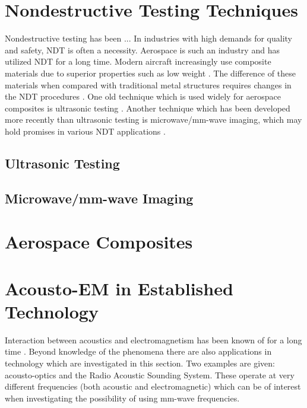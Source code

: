 \documentclass[11pt,twoside]{eitExjobb}
\begin{document}
	\section{Nondestructive Testing Techniques}
	Nondestructive testing has been ... In industries with high demands for quality and safety, NDT is often a necessity. Aerospace is such an industry and has utilized NDT for a long time. \addref Modern aircraft increasingly use composite materials due to superior properties such as low weight \cite{Katunin2015}. The difference of these materials when compared with traditional metal structures requires changes in the NDT procedures \cite{Riegert2006}. One old technique which is used widely for aerospace composites is ultrasonic testing \cite{Garnier2011}. Another technique which has been developed more recently than ultrasonic testing is microwave/mm-wave imaging, which may hold promises in various NDT applications \cite{Kharkovsky2007}.
	
	\subsection{Ultrasonic Testing}
	
	\subsection{Microwave/mm-wave Imaging}
	
	\section{Aerospace Composites}
	
	\section{Acousto-EM in Established Technology}
	Interaction between acoustics and electromagnetism has been known of for a long time \addref. Beyond knowledge of the phenomena there are also applications in technology which are investigated in this section. Two examples are given: acousto-optics and the Radio Acoustic Sounding System. These operate at very different frequencies (both acoustic and electromagnetic) which can be of interest when investigating the possibility of using mm-wave frequencies.
	
\end{document}
